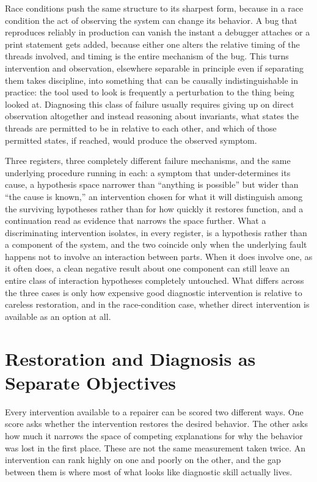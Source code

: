 \documentclass[11pt]{article}
\begin{document}
Race conditions push the same structure to its sharpest form, because in a race condition the act of observing the system can change its behavior. A bug that reproduces reliably in production can vanish the instant a debugger attaches or a print statement gets added, because either one alters the relative timing of the threads involved, and timing is the entire mechanism of the bug. This turns intervention and observation, elsewhere separable in principle even if separating them takes discipline, into something that can be causally indistinguishable in practice: the tool used to look is frequently a perturbation to the thing being looked at. Diagnosing this class of failure usually requires giving up on direct observation altogether and instead reasoning about invariants, what states the threads are permitted to be in relative to each other, and which of those permitted states, if reached, would produce the observed symptom.

Three registers, three completely different failure mechanisms, and the same underlying procedure running in each: a symptom that under-determines its cause, a hypothesis space narrower than ``anything is possible'' but wider than ``the cause is known,'' an intervention chosen for what it will distinguish among the surviving hypotheses rather than for how quickly it restores function, and a continuation read as evidence that narrows the space further. What a discriminating intervention isolates, in every register, is a hypothesis rather than a component of the system, and the two coincide only when the underlying fault happens not to involve an interaction between parts. When it does involve one, as it often does, a clean negative result about one component can still leave an entire class of interaction hypotheses completely untouched. What differs across the three cases is only how expensive good diagnostic intervention is relative to careless restoration, and in the race-condition case, whether direct intervention is available as an option at all.

\section{Restoration and Diagnosis as Separate Objectives}

Every intervention available to a repairer can be scored two different ways. One score asks whether the intervention restores the desired behavior. The other asks how much it narrows the space of competing explanations for why the behavior was lost in the first place. These are not the same measurement taken twice. An intervention can rank highly on one and poorly on the other, and the gap between them is where most of what looks like diagnostic skill actually lives.
\end{document}
